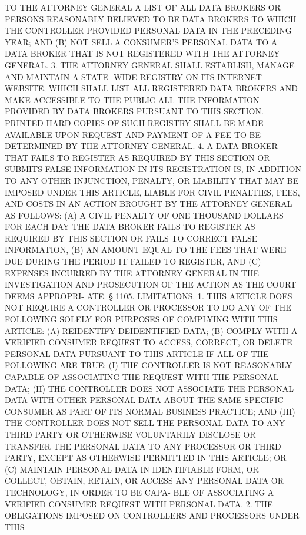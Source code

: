  TO THE ATTORNEY GENERAL A LIST OF ALL DATA BROKERS OR PERSONS REASONABLY
 BELIEVED TO BE DATA BROKERS TO WHICH THE  CONTROLLER  PROVIDED  PERSONAL
 DATA IN THE PRECEDING YEAR; AND
   (B)  NOT  SELL A CONSUMER'S PERSONAL DATA TO A DATA BROKER THAT IS NOT
 REGISTERED WITH THE ATTORNEY GENERAL.
   3. THE ATTORNEY GENERAL SHALL ESTABLISH, MANAGE AND MAINTAIN A  STATE-
 WIDE  REGISTRY  ON ITS INTERNET WEBSITE, WHICH SHALL LIST ALL REGISTERED
 DATA BROKERS AND MAKE ACCESSIBLE  TO  THE  PUBLIC  ALL  THE  INFORMATION
 PROVIDED  BY  DATA BROKERS PURSUANT TO THIS SECTION. PRINTED HARD COPIES
 OF SUCH REGISTRY SHALL BE MADE AVAILABLE UPON REQUEST AND PAYMENT  OF  A
 FEE TO BE DETERMINED BY THE ATTORNEY GENERAL.
   4. A DATA BROKER THAT FAILS TO REGISTER AS REQUIRED BY THIS SECTION OR
 SUBMITS  FALSE  INFORMATION  IN  ITS REGISTRATION IS, IN ADDITION TO ANY
 OTHER INJUNCTION, PENALTY, OR LIABILITY THAT MAY BE IMPOSED  UNDER  THIS
 ARTICLE,  LIABLE  FOR  CIVIL  PENALTIES,  FEES,  AND  COSTS IN AN ACTION
 BROUGHT BY THE ATTORNEY GENERAL AS FOLLOWS: (A) A CIVIL PENALTY  OF  ONE
 THOUSAND  DOLLARS  FOR  EACH  DAY  THE  DATA BROKER FAILS TO REGISTER AS
 REQUIRED BY THIS SECTION OR FAILS TO CORRECT FALSE INFORMATION,  (B)  AN
 AMOUNT  EQUAL  TO  THE FEES THAT WERE DUE DURING THE PERIOD IT FAILED TO
 REGISTER, AND (C) EXPENSES INCURRED  BY  THE  ATTORNEY  GENERAL  IN  THE
 INVESTIGATION AND PROSECUTION OF THE ACTION AS THE COURT DEEMS APPROPRI-
 ATE.
   §  1105. LIMITATIONS. 1. THIS ARTICLE DOES NOT REQUIRE A CONTROLLER OR
 PROCESSOR TO DO ANY OF THE FOLLOWING SOLELY FOR  PURPOSES  OF  COMPLYING
 WITH THIS ARTICLE:
   (A) REIDENTIFY DEIDENTIFIED DATA;
   (B)  COMPLY  WITH  A  VERIFIED CONSUMER REQUEST TO ACCESS, CORRECT, OR
 DELETE PERSONAL DATA PURSUANT TO THIS ARTICLE IF ALL  OF  THE  FOLLOWING
 ARE TRUE:
   (I)  THE  CONTROLLER  IS  NOT  REASONABLY  CAPABLE  OF ASSOCIATING THE
 REQUEST WITH THE PERSONAL DATA;
   (II) THE CONTROLLER DOES NOT ASSOCIATE THE PERSONAL  DATA  WITH  OTHER
 PERSONAL  DATA  ABOUT  THE  SAME SPECIFIC CONSUMER AS PART OF ITS NORMAL
 BUSINESS PRACTICE; AND
   (III) THE CONTROLLER DOES NOT SELL THE  PERSONAL  DATA  TO  ANY  THIRD
 PARTY OR OTHERWISE VOLUNTARILY DISCLOSE OR TRANSFER THE PERSONAL DATA TO
 ANY  PROCESSOR  OR  THIRD  PARTY,  EXCEPT AS OTHERWISE PERMITTED IN THIS
 ARTICLE; OR
   (C) MAINTAIN PERSONAL DATA IN IDENTIFIABLE FORM, OR  COLLECT,  OBTAIN,
 RETAIN,  OR ACCESS ANY PERSONAL DATA OR TECHNOLOGY, IN ORDER TO BE CAPA-
 BLE OF ASSOCIATING A VERIFIED CONSUMER REQUEST WITH PERSONAL DATA.
   2. THE OBLIGATIONS IMPOSED ON CONTROLLERS AND  PROCESSORS  UNDER  THIS
